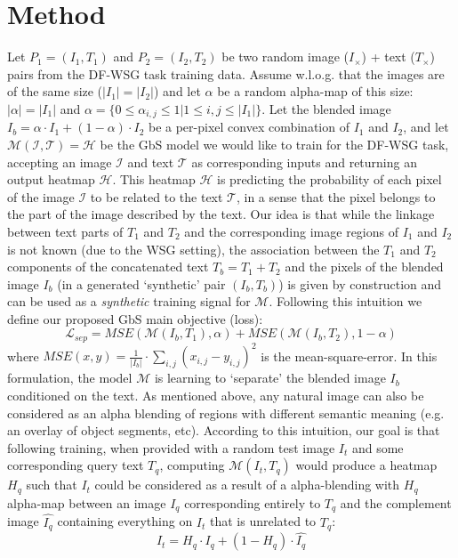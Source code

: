 \documentclass[10pt,twocolumn,letterpaper]{article}
\def\oursspace{{GbS }}
\def\ourstaskspace{DF-WSG }
\newcommand\secvspace{\vspace{-0.0cm}}
\begin{document}
\section{Method}\label{sec:method}
\secvspace
Let $P_1 = (I_1, T_1)$ and $P_2 = (I_2, T_2)$ be two random image ($I_{\times}$) + text ($T_{\times}$) pairs from the \ourstaskspace task training data.
Assume w.l.o.g. that the images are of the same size ($|I_1| = |I_2|$) and let $\alpha$ be a random alpha-map of this size: $|\alpha| = |I_1|$ and $\alpha = \{0 \le \alpha_{i,j} \le 1 | 1 \le i,j \le |I_1|\}$.
Let the blended image $I_b = \alpha \cdot I_1 + (1 - \alpha) \cdot I_2$ be a per-pixel convex combination of $I_1$ and $I_2$, and let $\mathcal{M}(\mathcal{I}, \mathcal{T}) = \mathcal{H}$ be the \oursspace model we would like to train for the \ourstaskspace task, accepting an image $\mathcal{I}$ and text $\mathcal{T}$ as corresponding inputs and returning an output heatmap $\mathcal{H}$. This heatmap $\mathcal{H}$ is predicting the probability of each pixel of the image $\mathcal{I}$ to be related to the text $\mathcal{T}$, in a sense that the pixel belongs to the part of the image described by the text. Our idea is that while the linkage between text parts of $T_1$ and $T_2$ and the corresponding image regions of $I_1$ and $I_2$ is not known (due to the WSG setting), the association between the $T_1$ and $T_2$ components of the concatenated text $T_b = T_1 + T_2$ 
and the pixels of the blended image $I_b$ (in a generated `synthetic' pair $\left( I_b, T_b \right)$) is given by construction 
and can be used as a \textit{synthetic} training signal for $\mathcal{M}$. Following this intuition we define our proposed \oursspace main objective (loss):
\begin{equation}
    \mathcal{L}_{sep} = MSE(\mathcal{M}(I_b, T_1), \alpha) + MSE(\mathcal{M}(I_b, T_2), 1 - \alpha)
\end{equation}
where $MSE(x,y) = \frac{1}{|I_b|} \cdot \sum_{i,j}{(x_{i,j} - y_{i,j})^2}$ is the mean-square-error. In this formulation, the model $\mathcal{M}$ is learning to `separate' the blended image $I_b$ conditioned on the text. As mentioned above, any natural image can also be considered as an alpha blending of regions with different semantic meaning (e.g. an overlay of object segments, etc). According to this intuition, our goal is that following training, when provided with a random test image $I_t$ and some corresponding query text $T_q$, computing $\mathcal{M}(I_t, T_q)$ would produce a heatmap $H_q$ such that $I_t$ could be considered as a result of a alpha-blending 
with $H_q$ alpha-map between an image $I_q$ corresponding entirely to $T_q$ and the complement image $\hat{I_q}$ containing everything on $I_t$ that is unrelated to $T_q$:
\begin{equation}
I_t = H_q \cdot I_q + (1 - H_q) \cdot \hat{I_q}
\end{equation}
\end{document}
